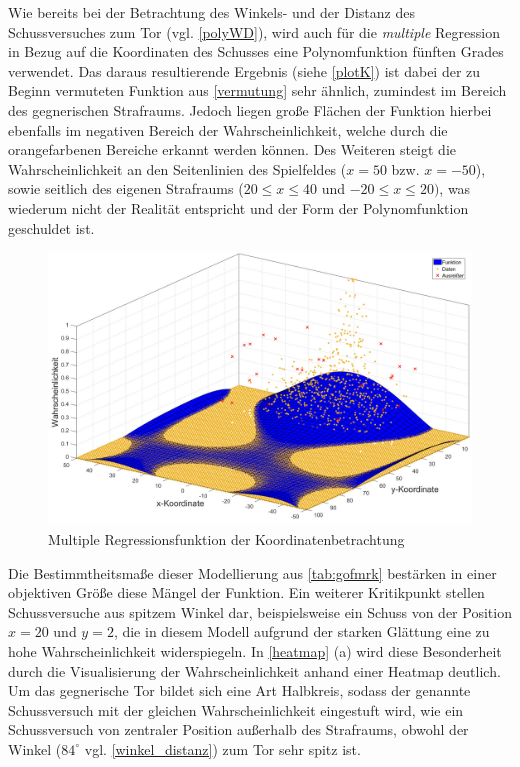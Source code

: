 Wie bereits bei der Betrachtung des Winkels- und der Distanz des Schussversuches zum Tor (vgl. \vref{polyWD}), wird auch für die \textit{multiple} Regression in Bezug auf die Koordinaten des Schusses eine Polynomfunktion fünften Grades verwendet. Das daraus resultierende Ergebnis (siehe \vref{plotK}) ist dabei der zu Beginn vermuteten Funktion aus \vref{vermutung} sehr ähnlich, zumindest im Bereich des gegnerischen Strafraums. Jedoch liegen große Flächen der Funktion hierbei ebenfalls im negativen Bereich der Wahrscheinlichkeit, welche durch die orangefarbenen Bereiche erkannt werden können. Des Weiteren steigt die Wahrscheinlichkeit an den Seitenlinien des Spielfeldes ($x=50$ bzw. $x=-50$), sowie seitlich des eigenen Strafraums ($20 \le x \le 40$ und $-20 \le x \le 20)$, was wiederum nicht der Realität entspricht und der Form der Polynomfunktion geschuldet ist.

\begin{figure}[H]
\centering
\includegraphics[scale=0.34]{se-wa-jpg/plotK}
\caption{Multiple Regressionsfunktion der Koordinatenbetrachtung}
\label{plotK}
\end{figure}

Die Bestimmtheitsmaße dieser Modellierung aus \vref{tab:gofmrk} bestärken in einer objektiven Größe diese Mängel der Funktion. Ein weiterer Kritikpunkt stellen Schussversuche aus spitzem Winkel dar, beispielsweise ein Schuss von der Position $x=20$ und $y=2$, die in diesem Modell aufgrund der starken Glättung eine zu hohe Wahrscheinlichkeit widerspiegeln. In \vref{heatmap} (a) wird diese Besonderheit durch die Visualisierung der Wahrscheinlichkeit anhand einer Heatmap deutlich. Um das gegnerische Tor bildet sich eine Art Halbkreis, sodass der genannte Schussversuch mit der gleichen Wahrscheinlichkeit eingestuft wird, wie ein Schussversuch von zentraler Position außerhalb des Strafraums, obwohl der Winkel ($84^\circ$ vgl. \vref{winkel_distanz}) zum Tor sehr spitz ist.

